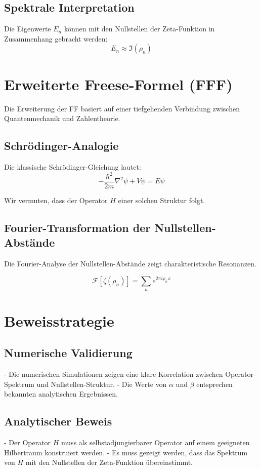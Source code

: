 \documentclass[a4paper,12pt]{article}
\begin{document}
\subsection{Spektrale Interpretation}
Die Eigenwerte \( E_n \) können mit den Nullstellen der Zeta-Funktion in Zusammenhang gebracht werden:
\begin{equation}
E_n \approx \Im(\rho_n)
\end{equation}

\section{Erweiterte Freese-Formel (FFF)}
Die Erweiterung der FF basiert auf einer tiefgehenden Verbindung zwischen Quantenmechanik und Zahlentheorie.

\subsection{Schrödinger-Analogie}
Die klassische Schrödinger-Gleichung lautet:
\begin{equation}
-\frac{\hbar^2}{2m} \nabla^2 \psi + V \psi = E \psi
\end{equation}

Wir vermuten, dass der Operator \( H \) einer solchen Struktur folgt.

\subsection{Fourier-Transformation der Nullstellen-Abstände}
Die Fourier-Analyse der Nullstellen-Abstände zeigt charakteristische Resonanzen.

\begin{equation}
\mathcal{F}[\zeta(\rho_n)] = \sum_{n} e^{2\pi i \rho_n x}
\end{equation}

\section{Beweisstrategie}
\subsection{Numerische Validierung}
- Die numerischen Simulationen zeigen eine klare Korrelation zwischen Operator-Spektrum und Nullstellen-Struktur.
- Die Werte von \( \alpha \) und \( \beta \) entsprechen bekannten analytischen Ergebnissen.

\subsection{Analytischer Beweis}
- Der Operator \( H \) muss als selbstadjungierbarer Operator auf einem geeigneten Hilbertraum konstruiert werden.
- Es muss gezeigt werden, dass das Spektrum von \( H \) mit den Nullstellen der Zeta-Funktion übereinstimmt.
\end{document}
